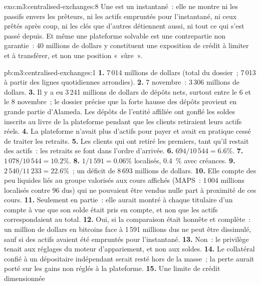 \begin{solution}{exo:m3:centralised-exchanges:8}
Une  est un instantané~: elle ne montre ni les passifs envers les prêteurs, ni les actifs empruntés pour l'instantané,
ni ceux prêtés après coup, ni les clés que d'autres détiennent aussi, ni tout ce qui s'est passé depuis. Et même une plateforme solvable est une
contrepartie non garantie~: 40 millions de dollars y constituent une exposition de crédit à limiter et à transférer, et non une position «~sûre~».
\end{solution}

\begin{solution}{pb:m3:centralised-exchanges:1}
\textbf{1.} 7\,014 millions de dollars (total du dossier~; 7\,013 à partir des lignes quotidiennes arrondies). \textbf{2.} 7
novembre~: 3\,306 millions de dollars. \textbf{3.} Il y a eu 3\,241 millions de dollars de dépôts nets, surtout entre le 6 et le 8 novembre~;
le dossier précise que la forte hausse des dépôts provient en grande partie d'Alameda. Les dépôts de l'entité affiliée
ont gonflé les soldes inscrits au livre de la plateforme pendant que les clients retiraient leurs actifs réels. \textbf{4.} La plateforme
n'avait plus d'actifs pour payer et avait en pratique cessé de traiter les retraits. \textbf{5.} Les
clients qui ont retiré les premiers, tant qu'il restait des actifs~: les retraits se font dans l'ordre d'arrivée. \textbf{6.} $694/10\,544
= 6.6\%$. \textbf{7.} $1\,078/10\,544 = 10.2\%$. \textbf{8.} $1/1\,591 = 0.06\%$ localisés, 0.4~\% avec
créances. \textbf{9.} $2\,540/11\,233 = 22.6\%$~; un déficit de 8\,693 millions de dollars. \textbf{10.} Elle compte
des  peu liquides liés au groupe valorisés aux cours affichés (MAPS~: 1\,004 millions localisés contre 96 dus) qui
ne pouvaient être vendus nulle part à proximité de ces cours. \textbf{11.} Seulement en partie~: elle aurait montré à chaque titulaire d'un compte à vue
que son solde était pris en compte, et non que les actifs correspondaient au total. \textbf{12.} Oui, si la comparaison
était honnête et complète~: un million de dollars en bitcoins face à 1\,591 millions dus ne peut être dissimulé, sauf si
des actifs avaient été empruntés pour l'instantané. \textbf{13.} Non~: le privilège tenait aux réglages du moteur
d'appariement, et non aux soldes. \textbf{14.} Le collatéral confié à un dépositaire indépendant serait resté hors
de la masse~; la perte aurait porté sur les gains non réglés à la plateforme. \textbf{15.} Une limite de crédit dimensionnée

\end{solution}
